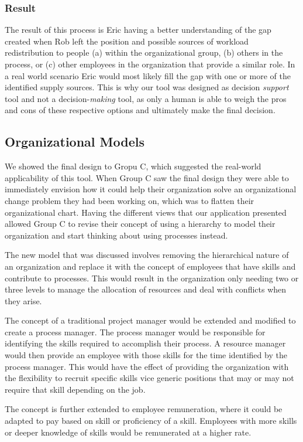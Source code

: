 \documentclass[journal]{vgtc}                %
\begin{document}
{{\subsubsection{Result}
The result of this process is Eric having a better understanding of the gap created when Rob left the position and possible sources of workload redistribution to people (a) within the organizational group, (b) others in the process, or (c) other employees in the organization that provide a similar role.
In a real world scenario Eric would most likely fill the gap with one or more of the identified supply sources.  This is why our tool was designed as decision \emph{support} tool and not a decision-\emph{making} tool, as only a human is able to weigh the pros and cons of these respective options and ultimately make the final decision. 

\subsection{Organizational Models}
We showed the final design to Gropu C, which suggested the real-world applicability of this tool. When Group C saw the final design they were able to immediately envision how it could help their organization solve an organizational change problem they had been working on, which was to flatten their organizational chart. Having the different views that our application presented allowed Group C to revise their concept of using a hierarchy to model their organization and start thinking about using processes instead.

The new model that was discussed involves removing the hierarchical nature of an organization and replace it with the concept of employees that have skills and contribute to processes.  This would result in the organization only needing two or three levels to manage the allocation of resources and deal with conflicts when they arise.

The concept of a traditional project manager would be extended and modified to create a process manager.  The process manager would be responsible for identifying the skills required to accomplish their process.  A resource manager would then provide an employee with those skills for the time identified by the process manager.  This would have the effect of providing the organization with the flexibility to recruit specific skills vice generic positions that may or may not require that skill depending on the job.

The concept is further extended to employee remuneration, where it could be adapted to pay based on skill or proficiency of a skill. Employees with more skills or deeper knowledge of skills would be remunerated at a higher rate.

}}
\end{document}
